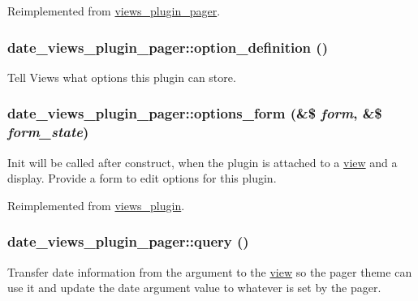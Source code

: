 Reimplemented from \hyperlink{classviews__plugin__pager_a8ab216a6bec20ad24a9645bb28f10cce}{views\_\-plugin\_\-pager}.\hypertarget{classdate__views__plugin__pager_a6b19aa893b485de7ef5b18e1f6fb578a}{
\subsubsection[{option\_\-definition}]{\setlength{\rightskip}{0pt plus 5cm}date\_\-views\_\-plugin\_\-pager::option\_\-definition ()}}
\label{classdate__views__plugin__pager_a6b19aa893b485de7ef5b18e1f6fb578a}
Tell Views what options this plugin can store. \hypertarget{classdate__views__plugin__pager_a8c8bdd845f1b47a3a2e6bcb9729756f8}{
\subsubsection[{options\_\-form}]{\setlength{\rightskip}{0pt plus 5cm}date\_\-views\_\-plugin\_\-pager::options\_\-form (\&\$ {\em form}, \/  \&\$ {\em form\_\-state})}}
\label{classdate__views__plugin__pager_a8c8bdd845f1b47a3a2e6bcb9729756f8}
Init will be called after construct, when the plugin is attached to a \hyperlink{classview}{view} and a display. Provide a form to edit options for this plugin. 

Reimplemented from \hyperlink{classviews__plugin_a1aaed8da1afd9f45293a37358c159837}{views\_\-plugin}.\hypertarget{classdate__views__plugin__pager_a59ac4b003dc6526dea57ec530266274b}{
\subsubsection[{query}]{\setlength{\rightskip}{0pt plus 5cm}date\_\-views\_\-plugin\_\-pager::query ()}}
\label{classdate__views__plugin__pager_a59ac4b003dc6526dea57ec530266274b}
Transfer date information from the argument to the \hyperlink{classview}{view} so the pager theme can use it and update the date argument value to whatever is set by the pager. 

